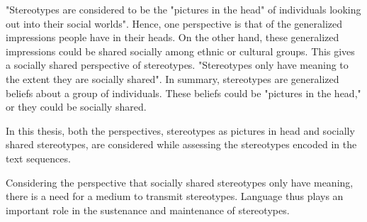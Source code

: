 "Stereotypes are considered to be the "pictures in the head" of individuals looking out into their social worlds"\cite{macrae1996stereotypes}. Hence, one perspective is that of the generalized impressions people have in their heads. On the other hand, these generalized impressions could be shared socially among ethnic or cultural groups. This gives a socially shared perspective of stereotypes. "Stereotypes only have meaning to the extent they are socially shared"\cite{macrae1996stereotypes}. In summary, stereotypes are generalized beliefs about a group of individuals. These beliefs could be "pictures in the head," or they could be socially shared. 

In this thesis, both the perspectives, stereotypes as pictures in head and socially shared stereotypes, are considered while assessing the stereotypes encoded in the text sequences.


Considering the perspective that socially shared stereotypes only have meaning, there is a need for a medium to transmit stereotypes. Language thus plays an important role in the sustenance and maintenance of stereotypes\cite{macrae1996stereotypes}.



